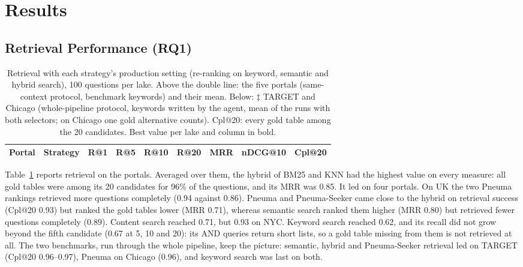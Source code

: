 \section{Results}
\label{sec:results}

\subsection{Retrieval Performance (RQ1)}
\label{sec:results-retrieval}

\begin{table}[p]
\caption{Retrieval with each strategy's production setting (re-ranking on
keyword, semantic and hybrid search), 100 questions per lake. Above the double
line: the five portals (same-context protocol, benchmark keywords) and their
mean. Below: $\ddagger$ TARGET and Chicago (whole-pipeline protocol, keywords
written by the agent, mean of the runs with both selectors; on Chicago one
gold alternative counts). Cpl@20: every gold table among the 20 candidates.
Best value per lake and column in bold.}
\label{tab:rq1}
\centering
\small
\setlength{\tabcolsep}{3pt}
\begin{tabular}{ll|cccc|cc|c}
\hline
Portal & Strategy & R@1 & R@5 & R@10 & R@20 & MRR & nDCG@10 & Cpl@20 \\
\hline
\end{tabular}
\end{table}

Table~\ref{tab:rq1} reports retrieval on the portals. Averaged over them, the
hybrid of BM25 and KNN had the highest value on every measure: all gold tables
were among its 20 candidates for 96\% of the questions, and its MRR was 0.85.
It led on four portals. On UK the two Pneuma rankings retrieved more questions
completely (0.94 against 0.86). Pneuma and Pneuma-Seeker came close to the
hybrid on retrieval success (Cpl@20 0.93) but ranked the gold tables lower
(MRR 0.71), whereas semantic search ranked them higher (MRR 0.80) but
retrieved fewer questions completely (0.89). Content search reached 0.71, but
0.93 on NYC. Keyword search reached 0.62, and its
recall did not grow beyond the fifth candidate (0.67 at 5, 10 and 20): its AND
queries return short lists, so a gold table missing from them is not retrieved
at all. The two benchmarks, run through the whole pipeline, keep the picture:
semantic, hybrid and Pneuma-Seeker retrieval led on TARGET (Cpl@20
0.96--0.97), Pneuma on Chicago (0.96), and keyword search was last on both.

